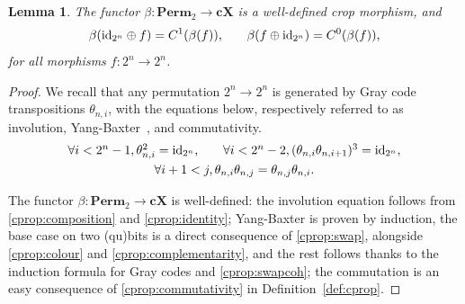 \documentclass[a4paper]{article}
\theoremstyle{plain}
\newtheorem{lemma}[theorem]{Lemma}
\theoremstyle{definition}
\newcommand{\cat}[1]{\mathbf{#1}}
\newcommand{\ccat}[1]{\mathbf{c #1}}
\newcommand{\iid}{\mathrm{id}}
\begin{document}
\begin{lemma}
	\label{lem:beta-wd}
	The functor $\beta \colon \cat{Perm}_2 \to \ccat X$ is a well-defined crop
	morphism, and
	\[
		\beta(\iid_{2^n} \oplus f) = C^1(\beta(f)) \text,
		\qquad
		\beta(f \oplus \iid_{2^n}) = C^0(\beta(f)) \text,
	\]
	for all morphisms $f \colon 2^n \to 2^n$.
\end{lemma}
\begin{proof}
	We recall that any permutation $2^n \to 2^n$ is generated by Gray code
	transpositions $\theta_{n,i}$, with the equations below, respectively
	referred to as involution, Yang-Baxter~\cite{perketauyang:yangbaxter}, and
	commutativity.
	\[
		\begin{array}{c}
			\forall i < 2^n -1, \theta_{n,i}^2 = \iid_{2^n} \text,
			\qquad
			\forall i < 2^n -2, (\theta_{n,i}\theta_{n,i+1})^3 = \iid_{2^n} \text,
			\\[0.8ex]
			\forall i+1 < j, \theta_{n,i}\theta_{n,j} = \theta_{n,j}\theta_{n,i} \text.
		\end{array}
	\]

	The functor $\beta \colon \cat{Perm}_2 \to \ccat X$ is well-defined: the
	involution equation follows from \ref{cprop:composition} and
	\ref{cprop:identity}; Yang-Baxter is proven by induction, the base case on
	two (qu)bits is a direct consequence of \ref{cprop:swap}, alongside
	\ref{cprop:colour} and \ref{cprop:complementarity}, and the rest follows
	thanks to the induction formula for Gray codes and \ref{cprop:swapcoh}; the
	commutation is an easy consequence of \ref{cprop:commutativity} in
	Definition~\ref{def:cprop}.


\end{proof}
\end{document}
